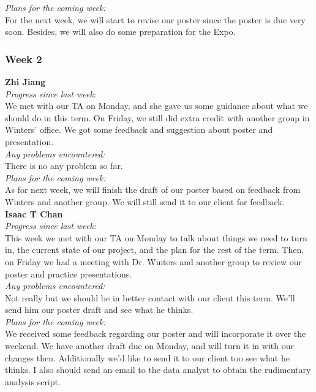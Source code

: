 \noindent\textit{Plans for the coming week:}\\
For the next week, we will start to revise our poster since the poster is due very soon. Besides, we will also do some preparation for the Expo.

\subsubsection{Week 2}
\textbf{Zhi Jiang}\\
\noindent\textit{Progress since last week:}\\
We met with our TA on Monday, and she gave us some guidance about what we should do in this term. On Friday, we still did extra credit with another group in Winters' office. We got some feedback and suggestion about poster and presentation.\\

\noindent\textit{Any problems encountered:}\\
There is no any problem so far.\\

\noindent\textit{Plans for the coming week:}\\
As for next week, we will finish the draft of our poster based on feedback from Winters and another group. We will still send it to our client for feedback.\\

\noindent\textbf{Isaac T Chan}\\
\noindent\textit{Progress since last week:}\\
This week we met with our TA on Monday to talk about things we need to turn in, the current state of our project, and the plan for the rest of the term. Then, on Friday we had a meeting with Dr. Winters and another group to review our poster and practice presentations.\\

\noindent\textit{Any problems encountered:}\\
Not really but we should be in better contact with our client this term. We'll send him our poster draft and see what he thinks.\\

\noindent\textit{Plans for the coming week:}\\
We received some feedback regarding our poster and will incorporate it over the weekend. We have another draft due on Monday, and will turn it in with our changes then. Additionally we'd like to send it to our client too see what he thinks. I also should send an email to the data analyst to obtain the rudimentary analysis script.\\


